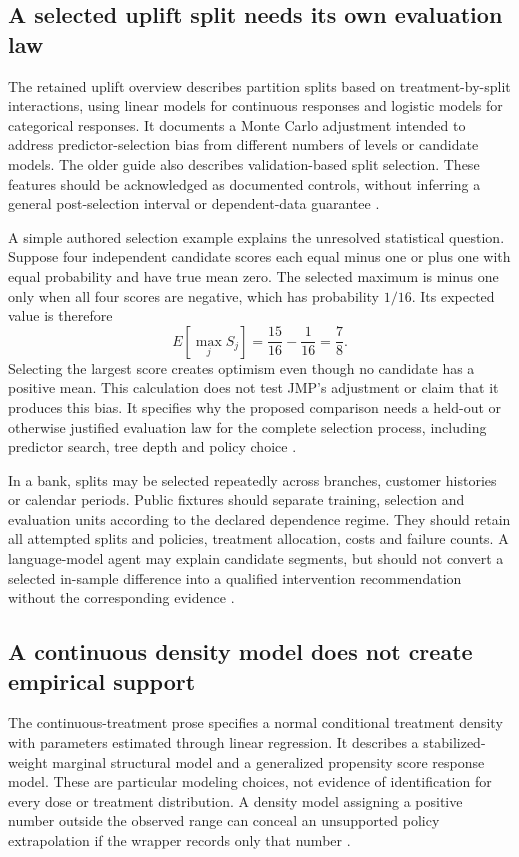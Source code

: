\subsection{A selected uplift split needs its own evaluation law}
The retained uplift overview describes partition splits based on
treatment-by-split interactions, using linear models for continuous
responses and logistic models for categorical responses. It documents a
Monte Carlo adjustment intended to address predictor-selection bias from
different numbers of levels or candidate models. The older guide also
describes validation-based split selection. These features should be
acknowledged as documented controls, without inferring a general
post-selection interval or dependent-data guarantee
\citep{exec13_ch_jmp_uplift}.

A simple authored selection example explains the unresolved statistical
question. Suppose four independent candidate scores each equal minus one
or plus one with equal probability and have true mean zero. The selected
maximum is minus one only when all four scores are negative, which has
probability $1/16$. Its expected value is therefore
\[
 E[\max_j S_j]=\frac{15}{16}-\frac1{16}=\frac78.
\]
Selecting the largest score creates optimism even though no candidate
has a positive mean. This calculation does not test JMP's adjustment or
claim that it produces this bias. It specifies why the proposed comparison
needs a held-out or otherwise justified evaluation law for the complete
selection process, including predictor search, tree depth and policy choice
\citep{exec24_jmp_choice}.

In a bank, splits may be selected repeatedly across branches, customer
histories or calendar periods. Public fixtures should separate training,
selection and evaluation units according to the declared dependence regime.
They should retain all attempted splits and policies, treatment allocation,
costs and failure counts. A language-model agent may explain candidate
segments, but should not convert a selected in-sample difference into a
qualified intervention recommendation without the corresponding evidence
\citep{exec24_jmp_choice}.

\subsection{A continuous density model does not create empirical support}
The continuous-treatment prose specifies a normal conditional treatment
density with parameters estimated through linear regression. It describes
a stabilized-weight marginal structural model and a generalized propensity
score response model. These are particular modeling choices, not evidence
of identification for every dose or treatment distribution. A density
model assigning a positive number outside the observed range can conceal
an unsupported policy extrapolation if the wrapper records only that number
\citep{exec13_ch_jmp_causal,exec24_jmp_choice}.

